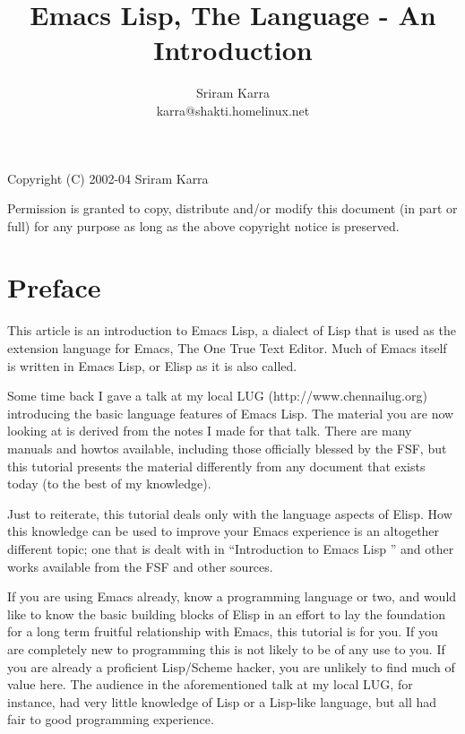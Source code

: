 \documentclass[10pt]{article}
\begin{document}
\title{Emacs Lisp, The Language - An Introduction}
\author{Sriram Karra \\ karra@shakti.homelinux.net}
\maketitle

\setcounter{bottomnumber}{0}
\setcounter{topnumber}{3}

\begin{center}
  Copyright (C) 2002-04 Sriram Karra
\end{center}

Permission is granted to copy, distribute and/or modify this document (in part
or full) for any purpose as long as the above copyright notice is preserved.

\newpage

\section{Preface}

This article is an introduction to Emacs Lisp, a dialect of Lisp that is used
as the extension language for Emacs, The One True Text Editor.  Much of Emacs
itself is written in Emacs Lisp, or Elisp as it is also called.

Some time back I gave a talk at my local LUG (http://www.chennailug.org)
introducing the basic language features of Emacs Lisp.  The material you are
now looking at is derived from the notes I made for that talk.  There are many
manuals and howtos available, including those officially blessed by the FSF,
but this tutorial presents the material differently from any document that
exists today (to the best of my knowledge).

Just to reiterate, this tutorial deals only with the language aspects of Elisp.
How this knowledge can be used to improve your Emacs experience is an
altogether different topic; one that is dealt with in ``Introduction to Emacs
Lisp '' and other works available from the FSF and other sources.

If you are using Emacs already, know a programming language or two, and would
like to know the basic building blocks of Elisp in an effort to lay the
foundation for a long term fruitful relationship with Emacs, this tutorial is
for you.  If you are completely new to programming this is not likely to be of
any use to you.  If you are already a proficient Lisp/Scheme hacker, you are
unlikely to find much of value here.  The audience in the aforementioned talk
at my local LUG, for instance, had very little knowledge of Lisp or a Lisp-like
language, but all had fair to good programming experience.
\end{document}
